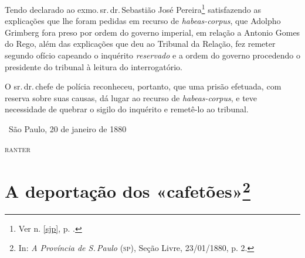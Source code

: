 Tendo declarado ao exmo.\,sr.\,dr.\,Sebastião José Pereira\footnote{Ver n. \ref{sjp}, p. \pageref{sjp}.}
satisfazendo as explicações
que lhe foram pedidas em recurso de \emph{habeas-corpus}, que Adolpho
Grimberg fora preso por ordem do governo imperial, em relação a Antonio
Gomes do Rego, além das explicações que deu ao Tribunal da Relação, fez
remeter segundo ofício capeando o inquérito \emph{reservado} e a ordem
do governo procedendo o presidente do tribunal à leitura do
interrogatório.

O sr.\,dr.\,chefe de polícia reconheceu, portanto, que uma prisão
efetuada, com reserva sobre suas causas, dá lugar ao recurso de
\emph{habeas-corpus}, e teve necessidade de quebrar o sigilo do
inquérito e remetê-lo ao tribunal.\medskip

\hfill\ São Paulo, 20 de janeiro de 1880

\hfill\textsc{ranter}

\chapter{A deportação dos «cafetões»\footnote{In: \emph{A Província
  de S.\,Paulo} (\textsc{sp}), Seção Livre, 23/01/1880, p. 2.}}

